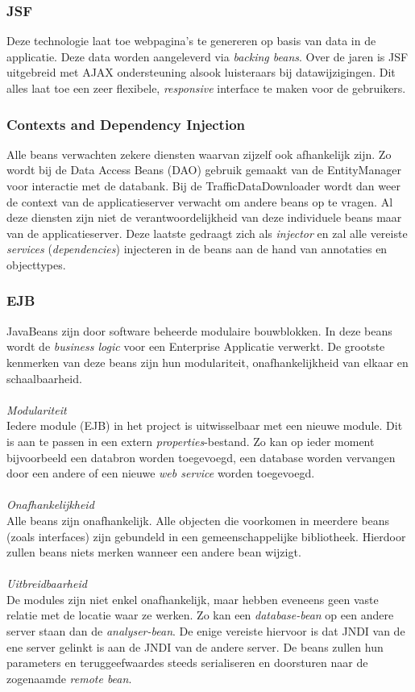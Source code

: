 \documentclass[ps,a4paper,oneside]{report}
\begin{document}
\subsubsection{JSF}
Deze technologie laat toe webpagina's te genereren op basis van data in de applicatie. Deze data worden aangeleverd via \textit{backing beans}. Over de jaren is JSF uitgebreid met AJAX ondersteuning alsook luisteraars bij datawijzigingen. Dit alles laat toe een zeer flexibele, \textit{responsive} interface te maken voor de gebruikers.
\subsubsection{Contexts and Dependency Injection}
Alle beans verwachten zekere diensten waarvan zijzelf ook afhankelijk zijn. Zo wordt bij de Data Access Beans (DAO) gebruik gemaakt van de EntityManager voor interactie met de databank. Bij de TrafficDataDownloader wordt dan weer de context van de applicatieserver verwacht om andere beans op te vragen. Al deze diensten zijn niet de verantwoordelijkheid van deze individuele beans maar van de applicatieserver. Deze laatste gedraagt zich als \textit{injector} en zal alle vereiste \textit{services} (\textit{dependencies}) injecteren in de beans aan de hand van annotaties en objecttypes.
\subsubsection{EJB}
JavaBeans zijn door software beheerde modulaire bouwblokken. In deze beans wordt de \textit{business logic} voor een Enterprise Applicatie verwerkt. De grootste kenmerken van deze beans zijn hun modulariteit, onafhankelijkheid van elkaar en schaalbaarheid.\\\\
\textit{Modulariteit}\\
Iedere module (EJB) in het project is uitwisselbaar met een nieuwe module. Dit is aan te passen in een extern \textit{properties}-bestand. Zo kan op ieder moment bijvoorbeeld een databron worden toegevoegd, een database worden vervangen door een andere of een nieuwe \textit{web service} worden toegevoegd.\\\\
\textit{Onafhankelijkheid}\\
Alle beans zijn onafhankelijk. Alle objecten die voorkomen in meerdere beans (zoals interfaces) zijn gebundeld in een gemeenschappelijke bibliotheek. Hierdoor zullen beans niets merken wanneer een andere bean wijzigt.\\\\
\textit{Uitbreidbaarheid}\\
De modules zijn niet enkel onafhankelijk, maar hebben eveneens geen vaste relatie met de locatie waar ze werken. Zo kan een \textit{database-bean} op een andere server staan dan de \textit{analyser-bean}. De enige vereiste hiervoor is dat JNDI van de ene server gelinkt is aan de JNDI van de andere server. De beans zullen hun parameters en teruggeefwaardes steeds serialiseren en doorsturen naar de zogenaamde \textit{remote bean}.
\clearpage
\end{document}
